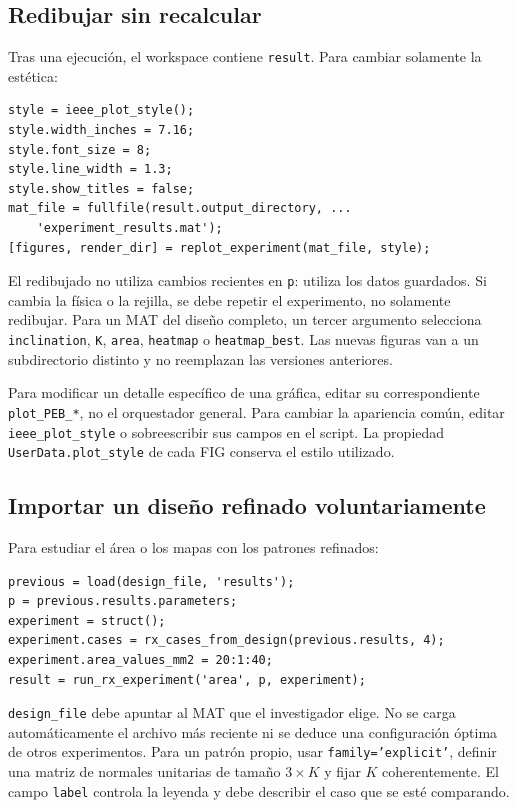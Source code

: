 \documentclass[11pt,a4paper]{article}
\begin{document}
\subsection{Redibujar sin recalcular}
Tras una ejecución, el workspace contiene \texttt{result}. Para cambiar solamente la estética:
\begin{verbatim}
style = ieee_plot_style();
style.width_inches = 7.16;
style.font_size = 8;
style.line_width = 1.3;
style.show_titles = false;
mat_file = fullfile(result.output_directory, ...
    'experiment_results.mat');
[figures, render_dir] = replot_experiment(mat_file, style);
\end{verbatim}
El redibujado no utiliza cambios recientes en \texttt{p}: utiliza los datos guardados. Si cambia la física o la rejilla, se debe repetir el experimento, no solamente redibujar. Para un MAT del diseño completo, un tercer argumento selecciona \texttt{inclination}, \texttt{K}, \texttt{area}, \texttt{heatmap} o \texttt{heatmap\_best}. Las nuevas figuras van a un subdirectorio distinto y no reemplazan las versiones anteriores.

Para modificar un detalle específico de una gráfica, editar su correspondiente \texttt{plot\_PEB\_*}, no el orquestador general. Para cambiar la apariencia común, editar \texttt{ieee\_plot\_style} o sobreescribir sus campos en el script. La propiedad \texttt{UserData.plot\_style} de cada FIG conserva el estilo utilizado.

\subsection{Importar un diseño refinado voluntariamente}
Para estudiar el área o los mapas con los patrones refinados:
\begin{verbatim}
previous = load(design_file, 'results');
p = previous.results.parameters;
experiment = struct();
experiment.cases = rx_cases_from_design(previous.results, 4);
experiment.area_values_mm2 = 20:1:40;
result = run_rx_experiment('area', p, experiment);
\end{verbatim}
\texttt{design\_file} debe apuntar al MAT que el investigador elige. No se carga automáticamente el archivo más reciente ni se deduce una configuración óptima de otros experimentos. Para un patrón propio, usar \texttt{family='explicit'}, definir una matriz de normales unitarias de tamaño $3\times K$ y fijar $K$ coherentemente. El campo \texttt{label} controla la leyenda y debe describir el caso que se esté comparando.
\end{document}

